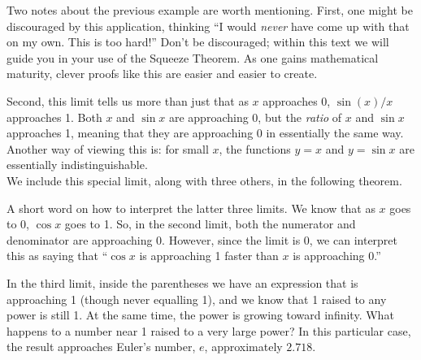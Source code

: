 Two notes about the previous example are worth mentioning. First, one might be discouraged by this application, thinking ``I would \textit{never} have come up with that on my own. This is too hard!'' Don't be discouraged; within this text we will guide you in your use of the Squeeze Theorem. As one gains mathematical maturity, clever proofs like this are easier and easier to create.

Second, this limit tells us more than just that as $x$ approaches 0, $\sin(x)/x$ approaches 1. Both $x$ and $\sin x$ are approaching 0, but the \textit{ratio} of $x$ and $\sin x$ approaches 1, meaning that they are approaching 0 in essentially the same way. Another way of viewing this is: for small $x$, the functions $y=x$ and $y=\sin x$ are essentially indistinguishable.\\

We include this special limit, along with three others, in the following theorem.


A short word on how to interpret the latter three limits. We know that as $x$ goes to 0, $\cos x$ goes to 1. So, in the second limit, both the numerator and denominator are approaching 0. However, since the limit is 0, we can interpret this as saying that ``$\cos x$ is approaching 1 faster than $x$ is approaching 0.''

In the third limit, inside the parentheses we have an expression that is approaching 1 (though never equalling 1), and we know that 1 raised to any power is still 1. At the same time, the power is growing toward infinity. What happens to a number near 1 raised to a very large power? In this particular case, the result approaches Euler's number, $e$, approximately $2.718.$

